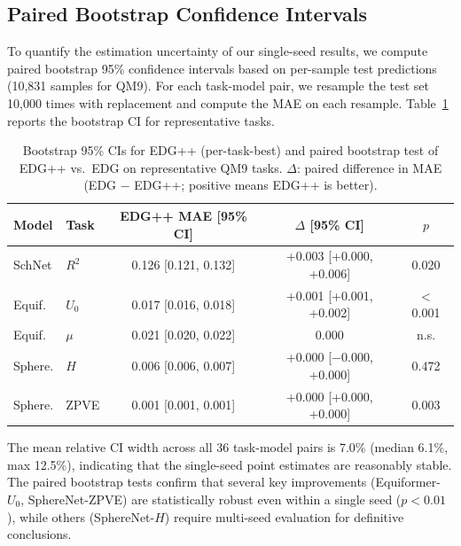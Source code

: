 \subsection{Paired Bootstrap Confidence Intervals}
\label{sec:appendix_bootstrap}

To quantify the estimation uncertainty of our single-seed results, we compute paired bootstrap 95\% confidence intervals based on per-sample test predictions (10,831 samples for QM9). For each task-model pair, we resample the test set 10,000 times with replacement and compute the MAE on each resample. Table~\ref{tab:bootstrap_ci} reports the bootstrap CI for representative tasks.

\begin{table}[!htb]
  \centering
  \caption{Bootstrap 95\% CIs for EDG++ (per-task-best) and paired bootstrap test of EDG++ vs.\ EDG on representative QM9 tasks. $\Delta$: paired difference in MAE (EDG $-$ EDG++; positive means EDG++ is better).}
  \label{tab:bootstrap_ci}
  \scriptsize
  \begin{tabular}{llccc}
    \toprule
    \textbf{Model} & \textbf{Task} & \textbf{EDG++ MAE [95\% CI]} & \textbf{$\Delta$ [95\% CI]} & \textbf{$p$} \\
    \midrule
    SchNet & $R^2$ & 0.126 [0.121, 0.132] & +0.003 [+0.000, +0.006] & 0.020 \\
    Equif. & $U_0$ & 0.017 [0.016, 0.018] & +0.001 [+0.001, +0.002] & $<$0.001 \\
    Equif. & $\mu$ & 0.021 [0.020, 0.022] & 0.000 & n.s. \\
    Sphere. & $H$ & 0.006 [0.006, 0.007] & +0.000 [$-$0.000, +0.000] & 0.472 \\
    Sphere. & ZPVE & 0.001 [0.001, 0.001] & +0.000 [+0.000, +0.000] & 0.003 \\
    \bottomrule
  \end{tabular}
\end{table}

The mean relative CI width across all 36 task-model pairs is 7.0\% (median 6.1\%, max 12.5\%), indicating that the single-seed point estimates are reasonably stable. The paired bootstrap tests confirm that several key improvements (Equiformer-$U_0$, SphereNet-ZPVE) are statistically robust even within a single seed ($p < 0.01$), while others (SphereNet-$H$) require multi-seed evaluation for definitive conclusions.


